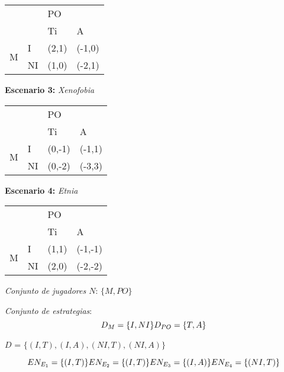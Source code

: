 \documentclass{homework}
\begin{document}
    
\begin{table}[]
\begin{tabular}{|ll|ll|}
\hline
\multicolumn{2}{|l|}{\multirow{2}{*}{}} & \multicolumn{2}{l|}{PO} \\ \cline{3-4} 
\multicolumn{2}{|l|}{} & \multicolumn{1}{l|}{Ti} & A \\ \hline
\multicolumn{1}{|c|}{\multirow{2}{*}{M}} & I & \multicolumn{1}{l|}{(2,1)} & (-1,0) \\ \cline{2-4} 
\multicolumn{1}{|c|}{} & NI & \multicolumn{1}{l|}{(1,0)} & (-2,1) \\ \hline
\end{tabular}
\end{table}



    \textbf{Escenario 3:} \emph{Xenofobia}
\begin{table}[]
\begin{tabular}{|ll|ll|}
\hline
\multicolumn{2}{|l|}{\multirow{2}{*}{}} & \multicolumn{2}{l|}{PO} \\ \cline{3-4} 
\multicolumn{2}{|l|}{} & \multicolumn{1}{l|}{Ti} & A \\ \hline
\multicolumn{1}{|c|}{\multirow{2}{*}{M}} & I & \multicolumn{1}{l|}{(0,-1)} & (-1,1) \\ \cline{2-4} 
\multicolumn{1}{|c|}{} & NI & \multicolumn{1}{l|}{(0,-2)} & (-3,3) \\ \hline
\end{tabular}
\end{table}


    \textbf{Escenario 4:} \emph{Etnia}
\begin{table}[]
\begin{tabular}{|ll|ll|}
\hline
\multicolumn{2}{|l|}{\multirow{2}{*}{}} & \multicolumn{2}{l|}{PO} \\ \cline{3-4} 
\multicolumn{2}{|l|}{} & \multicolumn{1}{l|}{Ti} & A \\ \hline
\multicolumn{1}{|c|}{\multirow{2}{*}{M}} & I & \multicolumn{1}{l|}{(1,1)} & (-1,-1) \\ \cline{2-4} 
\multicolumn{1}{|c|}{} & NI & \multicolumn{1}{l|}{(2,0)} & (-2,-2) \\ \hline
\end{tabular}
\end{table}



\emph{Conjunto de jugadores $N$}: $\{ M, PO\}$

\emph{Conjunto de estrategias}:
\begin{equation}
    D_M =  \{ I, NI\} \\
    D_{PO} = \{ T, A\}
\end{equation}

$D$ = $\{ (I, T), (I, A), (NI, T), (NI, A) \}$


\begin{equation}
    EN_{E_1} = \{ (I,T)\} \\
    EN_{E_2} = \{ (I,T)\}  \\
    EN_{E_3} = \{ (I,A)\} \\
    EN_{E_4} = \{ (NI,T)\} 
\end{equation}





\end{document}
